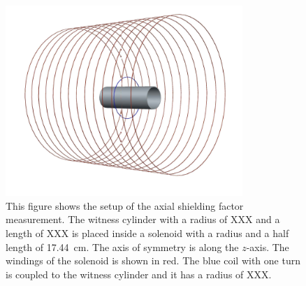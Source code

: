 \documentclass[review]{elsarticle}
\begin{document}
\begin{figure}[h!]
\begin{center}
   \includegraphics[width=0.8\textwidth]{geometry.png}
    \caption{This figure shows the setup of the axial shielding factor
      measurement. The witness cylinder with a radius of XXX and  a length of XXX is placed inside a
      solenoid with a radius and a half length of 17.44~cm. The axis of symmetry is along the $z$-axis. The windings
      of the solenoid is shown in red. The blue coil with one turn is
      coupled to the witness cylinder and it has a radius of XXX.  }
    \label{fig:geometry}
    \end{center}
\end{figure}
\end{document}
